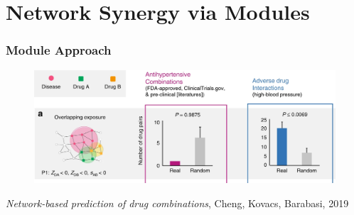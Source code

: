 \documentclass{beamer}
\begin{document}
\section{Network Synergy via Modules}


\begin{frame}
  \frametitle{Module Approach}
  \begin{figure}[!htb]
    \includegraphics[width=\linewidth]{figs/barabasi-hypertension-overlapping.png}
  \end{figure}
  \small{\textit{Network-based prediction of drug combinations}, Cheng, Kovacs, Barabasi, 2019}~\cite{Cheng2019} 
\end{frame}
\end{document}
